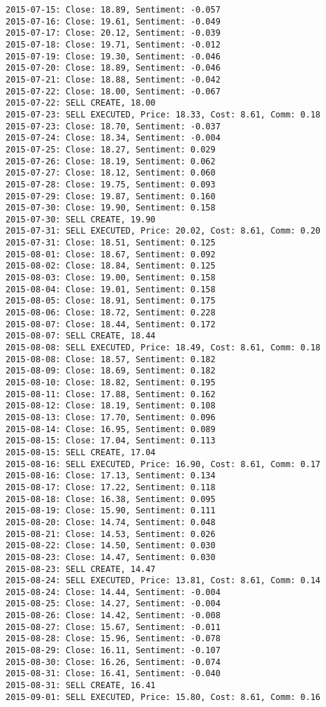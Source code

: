 \documentclass[11pt]{article}
\begin{document}
\begin{Verbatim}[commandchars=\\\{\}]
2015-07-15: Close: 18.89, Sentiment: -0.057
2015-07-16: Close: 19.61, Sentiment: -0.049
2015-07-17: Close: 20.12, Sentiment: -0.039
2015-07-18: Close: 19.71, Sentiment: -0.012
2015-07-19: Close: 19.30, Sentiment: -0.046
2015-07-20: Close: 18.89, Sentiment: -0.046
2015-07-21: Close: 18.88, Sentiment: -0.042
2015-07-22: Close: 18.00, Sentiment: -0.067
2015-07-22: SELL CREATE, 18.00
2015-07-23: SELL EXECUTED, Price: 18.33, Cost: 8.61, Comm: 0.18
2015-07-23: Close: 18.70, Sentiment: -0.037
2015-07-24: Close: 18.34, Sentiment: -0.004
2015-07-25: Close: 18.27, Sentiment: 0.029
2015-07-26: Close: 18.19, Sentiment: 0.062
2015-07-27: Close: 18.12, Sentiment: 0.060
2015-07-28: Close: 19.75, Sentiment: 0.093
2015-07-29: Close: 19.87, Sentiment: 0.160
2015-07-30: Close: 19.90, Sentiment: 0.158
2015-07-30: SELL CREATE, 19.90
2015-07-31: SELL EXECUTED, Price: 20.02, Cost: 8.61, Comm: 0.20
2015-07-31: Close: 18.51, Sentiment: 0.125
2015-08-01: Close: 18.67, Sentiment: 0.092
2015-08-02: Close: 18.84, Sentiment: 0.125
2015-08-03: Close: 19.00, Sentiment: 0.158
2015-08-04: Close: 19.01, Sentiment: 0.158
2015-08-05: Close: 18.91, Sentiment: 0.175
2015-08-06: Close: 18.72, Sentiment: 0.228
2015-08-07: Close: 18.44, Sentiment: 0.172
2015-08-07: SELL CREATE, 18.44
2015-08-08: SELL EXECUTED, Price: 18.49, Cost: 8.61, Comm: 0.18
2015-08-08: Close: 18.57, Sentiment: 0.182
2015-08-09: Close: 18.69, Sentiment: 0.182
2015-08-10: Close: 18.82, Sentiment: 0.195
2015-08-11: Close: 17.88, Sentiment: 0.162
2015-08-12: Close: 18.19, Sentiment: 0.108
2015-08-13: Close: 17.70, Sentiment: 0.096
2015-08-14: Close: 16.95, Sentiment: 0.089
2015-08-15: Close: 17.04, Sentiment: 0.113
2015-08-15: SELL CREATE, 17.04
2015-08-16: SELL EXECUTED, Price: 16.90, Cost: 8.61, Comm: 0.17
2015-08-16: Close: 17.13, Sentiment: 0.134
2015-08-17: Close: 17.22, Sentiment: 0.118
2015-08-18: Close: 16.38, Sentiment: 0.095
2015-08-19: Close: 15.90, Sentiment: 0.111
2015-08-20: Close: 14.74, Sentiment: 0.048
2015-08-21: Close: 14.53, Sentiment: 0.026
2015-08-22: Close: 14.50, Sentiment: 0.030
2015-08-23: Close: 14.47, Sentiment: 0.030
2015-08-23: SELL CREATE, 14.47
2015-08-24: SELL EXECUTED, Price: 13.81, Cost: 8.61, Comm: 0.14
2015-08-24: Close: 14.44, Sentiment: -0.004
2015-08-25: Close: 14.27, Sentiment: -0.004
2015-08-26: Close: 14.42, Sentiment: -0.008
2015-08-27: Close: 15.67, Sentiment: -0.011
2015-08-28: Close: 15.96, Sentiment: -0.078
2015-08-29: Close: 16.11, Sentiment: -0.107
2015-08-30: Close: 16.26, Sentiment: -0.074
2015-08-31: Close: 16.41, Sentiment: -0.040
2015-08-31: SELL CREATE, 16.41
2015-09-01: SELL EXECUTED, Price: 15.80, Cost: 8.61, Comm: 0.16

\end{Verbatim}
\end{document}
